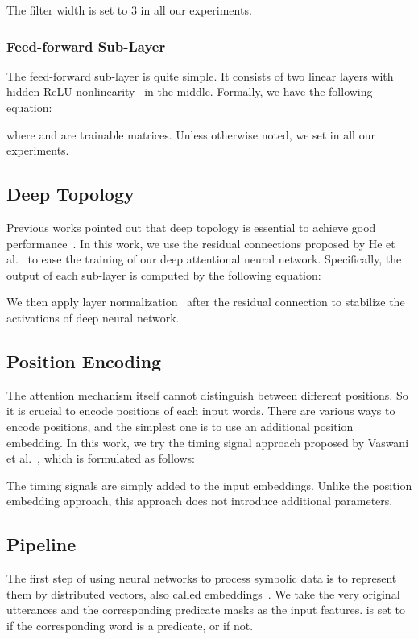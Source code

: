 \documentclass[letterpaper]{article} \usepackage{aaai18}  \usepackage{times}  \usepackage{helvet}  \usepackage{courier}  \usepackage{url}  \usepackage{graphicx}  \frenchspacing  \setlength{\pdfpagewidth}{8.5in}  \setlength{\pdfpageheight}{11in}  \usepackage{latexsym}
\begin{document}
The filter width  is set to 3 in all our experiments.

\subsubsection{Feed-forward Sub-Layer}
The feed-forward sub-layer is quite simple. It consists of two linear layers with hidden ReLU nonlinearity~\cite{nair2010rectified} in the middle. Formally, we have the following equation:

where  and  are trainable matrices. Unless otherwise noted, we set  in all our experiments.

\subsection{Deep Topology}
Previous works pointed out that deep topology is essential to achieve good performance~\cite{zhou2015end,he2017deep}. In this work, we use the residual connections proposed by He et al.~ to ease the training of our deep attentional neural network. Specifically, the output  of each sub-layer is computed by the following equation:

We then apply layer normalization~\cite{ba2016layer} after the residual connection to stabilize the activations of deep neural network.

\subsection{Position Encoding}
The attention mechanism itself cannot distinguish between different positions. So it is crucial to encode positions of each input words. There are various ways to encode positions, and the simplest one is to use an additional position embedding. In this work, we try the timing signal approach proposed by Vaswani et al.~, which is formulated as follows:

The timing signals are simply added to the input embeddings. Unlike the position embedding approach, this approach does not introduce additional parameters.

\subsection{Pipeline}
The first step of using neural networks to process symbolic data is to represent them by distributed vectors, also called embeddings~\cite{Bengio-Janvin-JMLR2003}. We take the very original utterances and the corresponding predicate masks  as the input features.  is set to  if the corresponding word is a predicate, or  if not.
\end{document}
